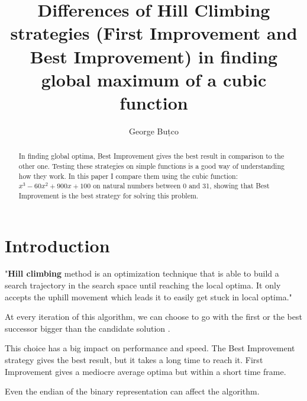 \documentclass{article}
\title{Differences of Hill Climbing strategies (First Improvement and Best Improvement) in finding global maximum of a cubic function}
\author{George Buțco}
\begin{document}
\maketitle

\begin{abstract}
In finding global optima, Best Improvement gives the best result in comparison to the other one. Testing these strategies on simple functions is a good way of understanding how they work. In this paper I compare them using the cubic function: $x^3-60x^2+900x+100$ on natural numbers between 0 and 31, showing that Best Improvement is the best strategy for solving this problem.
\end{abstract}

\section{Introduction}
"\textbf{Hill climbing} method is an optimization technique that is able to build a search trajectory in the
search space until reaching the local optima. It only accepts the uphill movement which leads it to
easily get stuck in local optima."\cite{hillClimbing}

At every iteration of this algorithm, we can choose to go with the first or the best successor bigger than the candidate solution \cite{fibi}.

This choice has a big impact on performance and speed. The Best Improvement strategy gives the best result, but it takes a long time to reach it. First Improvement gives a mediocre average optima but within a short time frame. \cite{HCSA}

Even the endian\cite{endians} of the binary representation can affect the algorithm. 
\end{document}
